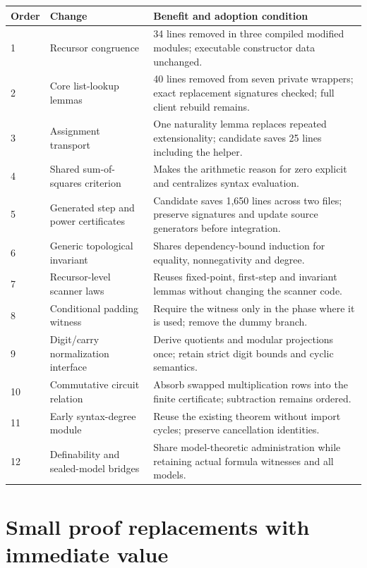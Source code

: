 \documentclass[11pt,letterpaper]{article}
\begin{document}
\small
\begin{longtable}{p{}p{}p{}}
\toprule
Order & Change & Benefit and adoption condition\\
\midrule
\endhead
1 & Recursor congruence & 34 lines removed in three compiled modified modules; executable constructor data unchanged.\\
2 & Core list-lookup lemmas & 40 lines removed from seven private wrappers; exact replacement signatures checked; full client rebuild remains.\\
3 & Assignment transport & One naturality lemma replaces repeated extensionality; candidate saves 25 lines including the helper.\\
4 & Shared sum-of-squares criterion & Makes the arithmetic reason for zero explicit and centralizes syntax evaluation.\\
5 & Generated step and power certificates & Candidate saves 1,650 lines across two files; preserve signatures and update source generators before integration.\\
6 & Generic topological invariant & Shares dependency-bound induction for equality, nonnegativity and degree.\\
7 & Recursor-level scanner laws & Reuses fixed-point, first-step and invariant lemmas without changing the scanner code.\\
8 & Conditional padding witness & Require the witness only in the phase where it is used; remove the dummy branch.\\
9 & Digit/carry normalization interface & Derive quotients and modular projections once; retain strict digit bounds and cyclic semantics.\\
10 & Commutative circuit relation & Absorb swapped multiplication rows into the finite certificate; subtraction remains ordered.\\
11 & Early syntax-degree module & Reuse the existing theorem without import cycles; preserve cancellation identities.\\
12 & Definability and sealed-model bridges & Share model-theoretic administration while retaining actual formula witnesses and all models.\\
\bottomrule
\end{longtable}
\normalsize

\section{Small proof replacements with immediate value}
\end{document}
